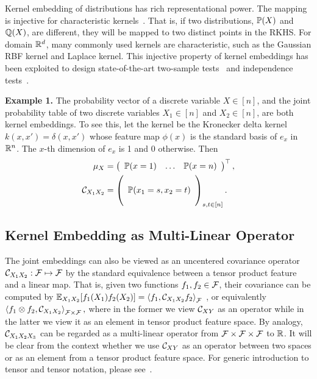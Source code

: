\documentclass{article}
\begin{document}
Kernel embedding of distributions has rich representational power. The mapping is injective for characteristic kernels~\cite{SriGreFukLanetal08}. That is, if two distributions, $\mathbb{P}(X)$ and $\mathbb{Q}(X)$, are different, they will be mapped to two distinct points in the RKHS. For domain $\mathbb{R}^d$, many commonly used kernels are characteristic, such as the Gaussian RBF kernel and Laplace kernel.
This injective property of kernel embeddings has been exploited to design  state-of-the-art two-sample tests~\cite{GreBorRasSchetal12} and  independence tests~\cite{GreFukTeoSonetal08}.

{\bf Example 1.} The probability vector of a discrete variable $X \in [n]$, and the joint probability table of two discrete variables $X_1 \in [n]$ and $X_2 \in [n]$, are both kernel embeddings. To see this, let the kernel be the Kronecker delta kernel $k(x,x') = \delta(x,x')$ whose feature map $\phi(x)$ is the standard basis of $e_{x}$ in $\mathbb{R}^n$. The $x$-th dimension of $e_{x}$ is 1 and 0 otherwise. Then
\begin{align}
    \mu_X
		& = \left(
      \begin{array}{ccc}
         \mathbb{P}(x = 1) &
         \hdots &
         \mathbb{P}(x = n)
       \end{array}
    \right)^\top, \nonumber \\
		\mathcal{C}_{X_1X_2}
		&=
		\left(
        \begin{array}{c}
            \cr
            \mathbb{P}(x_1=s,x_2=t) \cr
						\cr
        \end{array}
    \right)_{s,t \in [n]}. \nonumber
\end{align}

\subsection{Kernel Embedding as Multi-Linear Operator}

The joint embeddings can also be viewed as an uncentered covariance operator $\mathcal{C}_{X_1X_2}:\mathcal{F}\mapsto \mathcal{F}$ by the standard equivalence between a tensor product feature and a linear map.
That is, given two functions $f_1,f_2\in\mathcal{F}$, their covariance can be computed by
$
    \mathbb{E}_{X_1X_2}[f_1(X_1)f_2(X_2)]=\left\langle f_1,\mathcal{C}_{X_1X_2} f_2 \right\rangle_{\mathcal{F}}
$
, or equivalently
$
\left\langle f_1\otimes f_2,\mathcal{C}_{X_1X_2} \right\rangle_{\mathcal{F}\times\mathcal{F}},
$
where in the former we view $\mathcal{C}_{XY}$ as an operator while in the latter we view it as an element in tensor product feature space.
By analogy, $\mathcal{C}_{X_1X_2X_3}$ can be regarded as a multi-linear operator from $\mathcal{F}\times\mathcal{F}\times\mathcal{F}$ to $\mathbb{R}$.
It will be clear from the context whether we use $\mathcal{C}_{XY}$ as an operator between two spaces or as an element from a tensor product feature space. For generic introduction to tensor and tensor notation, please see~\cite{KolBad09}.
\end{document}
